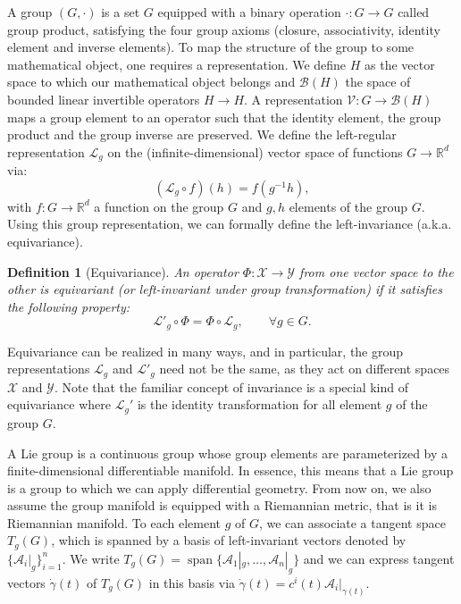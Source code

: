 \documentclass{article}
\newtheorem{definition}{Definition}[section]
\DeclareMathOperator{\spn}{span}
\begin{document}
A group $(G, \cdot)$ is a set $G$ equipped with a binary operation $\cdot : G \to G$ called group product, satisfying the four group axioms (closure, associativity, identity element and inverse elements). To map the structure of the group to some mathematical object, one requires a representation. We define $H$ as the vector space to which our mathematical object belongs and $\mathcal{B}(H)$ the space of bounded linear invertible operators $H \to H$. A representation $\mathcal{V} : G \to \mathcal{B}(H)$ maps a group element to an operator such that the identity element, the group product and the group inverse are preserved. We define the left-regular representation $\mathcal{L}_g$ on the (infinite-dimensional) vector space of functions $G \to \mathbb{R}^d$ via:
\begin{equation}
(\mathcal{L}_g \circ f )(h) = f(g^{-1}h),
\end{equation}
with $f : G \to \mathbb{R}^d$ a function on the group $G$ and $g, h$ elements of the group $G$. Using this group representation, we can formally define the left-invariance (a.k.a. equivariance).

\begin{definition}[Equivariance] \label{def:equivariance}
An operator $\Phi : \mathcal{X} \to \mathcal{Y}$ from one vector space to the other is equivariant (or left-invariant under group transformation) if it satisfies the following property:
\begin{equation}
\mathcal{L}'_g \circ \Phi = \Phi \circ \mathcal{L}_g, \qquad \forall g \in G.
\end{equation}
\end{definition}

Equivariance can be realized in many ways, and in particular, the group representations $\mathcal{L}_g$ and $\mathcal{L}'_g$ need not be the same, as they act on different spaces $\mathcal{X}$ and $\mathcal{Y}$. Note that the familiar concept of invariance is a special kind of equivariance where  $\mathcal{L}_g'$ is the identity transformation for all element $g$ of the group $G$.


A Lie group is a continuous group whose group elements are parameterized by a finite-dimensional differentiable manifold. In essence, this means that a Lie group is a group to which we can apply differential geometry. From now on, we also assume the group manifold is equipped with a Riemannian metric, that is it is Riemannian manifold. To each element $g$ of $G$, we can associate a tangent space $T_g(G)$, which is spanned by a basis of left-invariant vectors denoted by $\{\mathcal{A}_i|_g\}_{i=1}^n$. We write $T_g(G) = \spn\{\mathcal{A}_1|_g, \dots, \mathcal{A}_n|_g\}$ and we can express tangent vectors $\dot{\gamma}(t)$ of $T_g(G)$ in this basis via $\dot{\gamma}(t) = c^i(t) \mathcal{A}_i|_{\gamma(t)}$.
\end{document}
